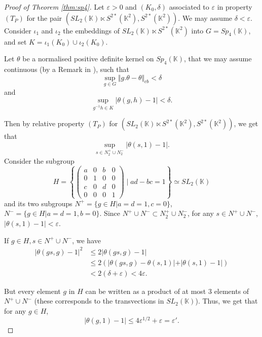 \documentclass{article}
\theoremstyle{definition}
\theoremstyle{remark}
\numberwithin{equation}{section}
\newcommand{\K}{\mathbb{K}}
\begin{document}
\begin{proof}[Proof of Theorem \ref{thm:sp4}]
Let $\varepsilon>0$ and $(K_0,\delta)$ associated to $\varepsilon$ in property $(T_P)$ for the pair $\left(SL_2(\K)\ltimes S^{2*}(\K^2),S^{2*}(\K^2)\right)$. We may assume $\delta<\varepsilon$. Consider $\iota_1$ and $\iota_2$ the embeddings of $SL_2(\K)\ltimes S^{2*}(\K^2)$ into $G=Sp_4(\K)$, and set $K=\iota_1(K_0)\cup \iota_2(K_0)$.\medskip

Let $\theta$ be a normalised positive definite kernel on $Sp_4(\K)$, that we may assume continuous (by a Remark in \cite[Section 3]{Ozawa+2011+89+104}), such that $$\underset{g\in G}{\sup}\Vert g.\theta-\theta\Vert_{cb}<\delta$$and $$\underset{g^{-1}h\in K}{\sup}\vert \theta(g,h)-1\vert<\delta.$$

Then by relative property $(T_P)$ for $(SL_2(\K)\ltimes S^{2*}(\K^2),S^{2*}(\K^2))$, we get that $$\underset{s\in N_2^+\cup N_2^-}{\sup} \vert \theta(s,1)-1\vert.$$Consider the subgroup $$
H=\left\lbrace\begin{pmatrix}
    a &0&b&0\\
    0&1&0&0\\
    c&0&d&0\\
    0&0&0&1
\end{pmatrix}\mid ad-bc=1\right\rbrace\simeq SL_2(\mathbb{K})$$and its two subgroups $N^+=\{g\in H\vert a=d=1,c=0\}$, $N^-=\{g\in H\vert a=d=1,b=0\}$. Since $N^+\cup N^-\subset N_2^+\cup N_2^-$, for any $s\in N^+\cup N^-$, $\vert \theta(s,1)-1\vert<\varepsilon$.

If $g\in H,s\in  N^+\cup N^-$, we have \begin{align*}
    \vert \theta(gs,g)-1\vert^2 & \leq 2\vert \theta(gs,g)-1\vert  \\
     & \leq 2(\vert  \theta(gs,g)-\theta(s,1)\vert+\vert \theta(s,1)-1\vert)\\
     & <  2(\delta+\varepsilon) < 4\varepsilon.
\end{align*}

But every element $g$ in $H$ can be written as a product of at most $3$ elements of $N^+\cup N^-$ (these corresponds to the transvections in $SL_2(\K)$). Thus, we get that for any $g\in H$, $$\vert \theta(g,1)-1\vert \leq 4\varepsilon^{1/2}+\varepsilon=\varepsilon'.$$


\end{proof}
\end{document}
